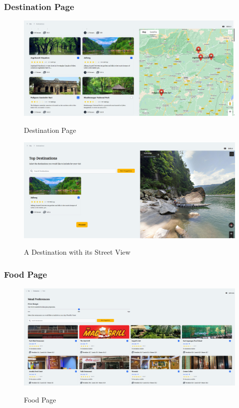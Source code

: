 \documentclass[12pt]{article}
\begin{document}
\subsubsection{Destination Page}
\begin{figure}[H]
    \centering
        \includegraphics[width=\textwidth]{Frontend SS/Destination1.png}
        \label{fig:Destination1}
    \caption{Destination Page}
\end{figure}
\begin{figure}[H]
    \centering
        \includegraphics[width=\textwidth]{Frontend SS/Destination Street View.png}
        \label{fig:DestinationStreetView}
    \caption{A Destination with its Street View}
\end{figure}

\subsubsection{Food Page}
\begin{figure}[H]
    \centering
        \includegraphics[width=\textwidth]{Frontend SS/Restaurant.png}
        \label{fig:Restaurant}
    \caption{Food Page}
\end{figure}
\end{document}
